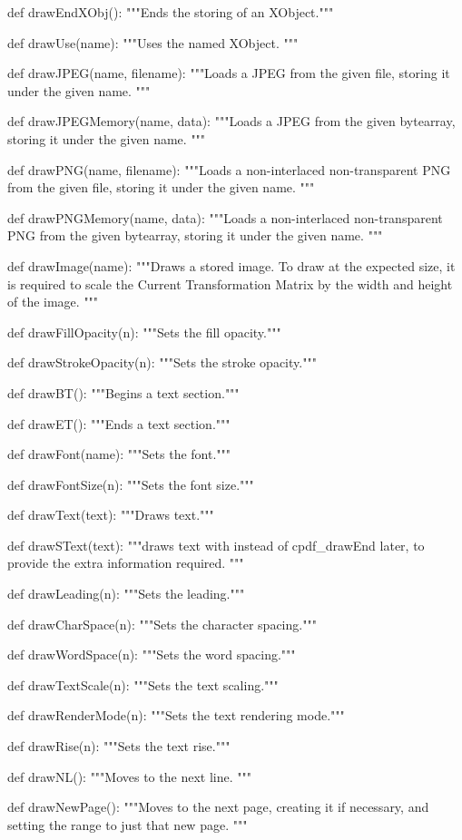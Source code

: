 def drawEndXObj():
    """Ends the storing of an XObject."""

def drawUse(name):
    """Uses the named XObject. """

def drawJPEG(name, filename):
    """Loads a JPEG from the given file, storing it under the given name. """

def drawJPEGMemory(name, data):
    """Loads a JPEG from the given bytearray, storing it under the given name.
    """

def drawPNG(name, filename):
    """Loads a non-interlaced non-transparent PNG from the given file, storing
    it under the given name. """

def drawPNGMemory(name, data):
    """Loads a non-interlaced non-transparent PNG from the given bytearray,
    storing it under the given name. """

def drawImage(name):
    """Draws a stored image. To draw at the expected size, it is required to
    scale the Current Transformation Matrix by the width and height of the
    image. """

def drawFillOpacity(n):
    """Sets the fill opacity."""

def drawStrokeOpacity(n):
    """Sets the stroke opacity."""

def drawBT():
    """Begins a text section."""

def drawET():
    """Ends a text section."""

def drawFont(name):
    """Sets the font."""

def drawFontSize(n):
    """Sets the font size."""

def drawText(text):
    """Draws text."""

def drawSText(text):
    """draws text with %
    instead of cpdf_drawEnd later, to provide the extra information required.
    """

def drawLeading(n):
    """Sets the leading."""

def drawCharSpace(n):
    """Sets the character spacing."""

def drawWordSpace(n):
    """Sets the word spacing."""

def drawTextScale(n):
    """Sets the text scaling."""

def drawRenderMode(n):
    """Sets the text rendering mode."""

def drawRise(n):
    """Sets the text rise."""

def drawNL():
    """Moves to the next line. """

def drawNewPage():
    """Moves to the next page, creating it if necessary, and setting the range
    to just that new page. """
